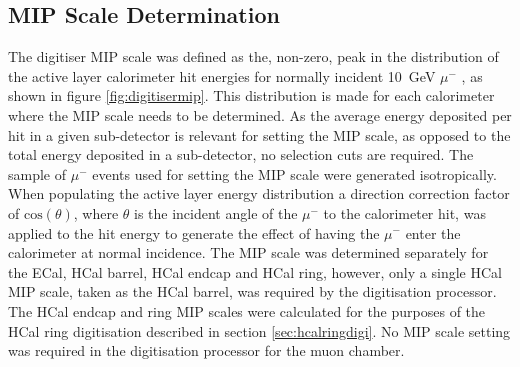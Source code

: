\subsection{MIP Scale Determination}
\label{sec:mipresponse}
The digitiser MIP scale was defined as the, non-zero, peak in the distribution of the active layer calorimeter hit energies for normally incident 10~GeV $\mu^{-}$ \cite{Bichsel:2004ej}, as shown in figure \ref{fig:digitisermip}.  This distribution is made for each calorimeter where the MIP scale needs to be determined.  As the average energy deposited per hit in a given sub-detector is relevant for setting the MIP scale, as opposed to the total energy deposited in a sub-detector, no selection cuts are required.  The sample of $\mu^{-}$ events used for setting the MIP scale were generated isotropically.  When populating the active layer energy distribution a direction correction factor of $\text{cos}(\theta)$, where $\theta$ is the incident angle of the $\mu^{-}$ to the calorimeter hit, was applied to the hit energy to generate the effect of having the $\mu^{-}$ enter the calorimeter at normal incidence.  The MIP scale was determined separately for the ECal, HCal barrel, HCal endcap and HCal ring, however, only a single HCal MIP scale, taken as the HCal barrel, was required by the digitisation processor.  The HCal endcap and ring MIP scales were calculated for the purposes of the HCal ring digitisation described in section \ref{sec:hcalringdigi}.  No MIP scale setting was required in the digitisation processor for the muon chamber.  

